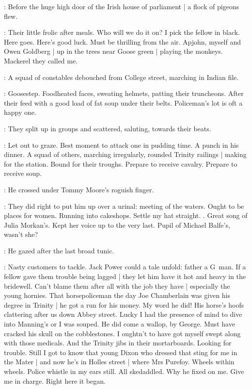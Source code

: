 :
Before the huge high door of the Irish house of parliament |
a flock of pigeons flew.

\BloomInt:
Their little frolic after meals.
Who will we do it on?
I pick the fellow in black.
Here goes.
Here's good luck.
Must be thrilling from the air.
Apjohn, myself and Owen Goldberg |
up in the trees near Goose green |
playing the monkeys.
Mackerel they called me.

:
A squad of constables debouched from College street,
marching in Indian file.

\BloomInt:
Goosestep.
Foodheated faces,
sweating helmets,
patting their truncheons.
After their feed with a good load of fat soup under their belts.
Policeman's lot is oft a happy one.

:
They split up in groups and scattered,
saluting,
towards their beats.

\BloomInt:
Let out to graze.
Best moment to attack one in pudding time.
A punch in his dinner.
A squad of others,
marching irregularly,
rounded Trinity railings |
making for the station.
Bound for their troughs.
Prepare to receive cavalry.
Prepare to receive soup.

:
He crossed under Tommy Moore's roguish finger.

\BloomInt:
They did right to put him up over a urinal:
meeting of the waters.
Ought to be places for women.
Running into cakeshops.
Settle my hat straight.
.
Great song of Julia Morkan's.
Kept her voice up to the very last.
Pupil of Michael Balfe's,
wasn't she?

:
He gazed after the last broad tunic.

\BloomInt:
Nasty customers to tackle.
Jack Power could a tale unfold:
father a G~man.
If a fellow gave them trouble being lagged |
they let him have it hot and heavy in the bridewell.
Can't blame them after all with the job they have |
especially the young hornies.
That horsepoliceman the day Joe Chamberlain was given his degree in Trinity |
he got a run for his money.
My word he did!
His horse's hoofs clattering after us down Abbey street.
Lucky I had the presence of mind to dive into Manning's or I was souped.
He did come a wallop,
by George.
Must have cracked his skull on the cobblestones.
I oughtn't to have got myself swept along with those medicals.
And the Trinity jibs in their mortarboards.
Looking for trouble.
Still I got to know that young Dixon
who dressed that sting for me in the Mater |
and now he's in Holles street |
where Mrs Purefoy.
Wheels within wheels.
Police whistle in my ears still.
All skedaddled.
Why he fixed on me.
Give me in charge.
Right here it began.

